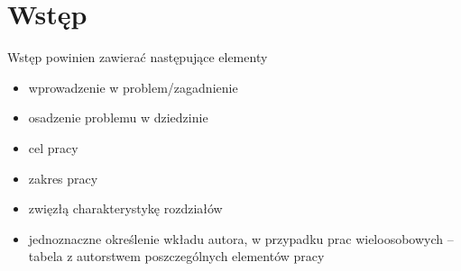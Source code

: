 \chapter{Wstęp}
\label{ch:wstep}
Wstęp powinien zawierać następujące elementy
\begin{itemize}
\item wprowadzenie w problem/zagadnienie
\item osadzenie problemu w dziedzinie
\item cel pracy
\item zakres pracy
\item zwięzłą charakterystykę rozdziałów
\item jednoznaczne określenie wkładu autora, w przypadku prac wieloosobowych – tabela z autorstwem poszczególnych elementów pracy
\end{itemize}

